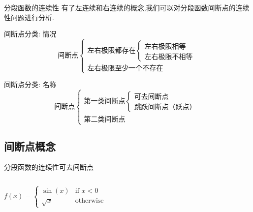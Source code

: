 \documentclass[
10pt,
aspectratio=43,
]{beamer}
\begin{document}
\begin{frame}{分段函数的连续性}
	有了左连续和右连续的概念,我们可以对分段函数间断点的连续性问题进行分析.
	\pause
	\begin{block}{间断点分类: 情况}
		\begin{equation*}
			\text{间断点}\left\{
			\begin{array}{ll}
				\text{左右极限都存在}\left\{ 
				\begin{array}{ll}                   
				\text{左右极限相等}           \\
				\text{左右极限不相等}        
			\end{array}
			\right.\\
			\text{左右极限至少一个不存在}
			\end{array}
			\right.
		\end{equation*}
	\end{block}
	\pause
	\begin{exampleblock}{间断点分类: 名称}
		\begin{equation*}
			\text{间断点}\left\{
			\begin{array}{ll}
				\text{第一类间断点}\left\{   
				\begin{array}{ll}                  
				\text{可去间断点}             \\
				\text{跳跃间断点（跃点）} 
			\end{array}
			\right.\\
			\text{第二类间断点}
			\end{array}
			\right.
		\end{equation*}
	\end{exampleblock}
\end{frame}

\subsection{间断点概念}
\begin{frame}{分段函数的连续性}{可去间断点}
	\begin{columns}[onlytextwidth]
		\[
			f(x) = \begin{cases}
			\sin(x) & \text{if } x < 0 \\
			\sqrt{x} & \text{otherwise}
			\end{cases}
		\]
	\end{columns}
\end{frame}
\end{document}

